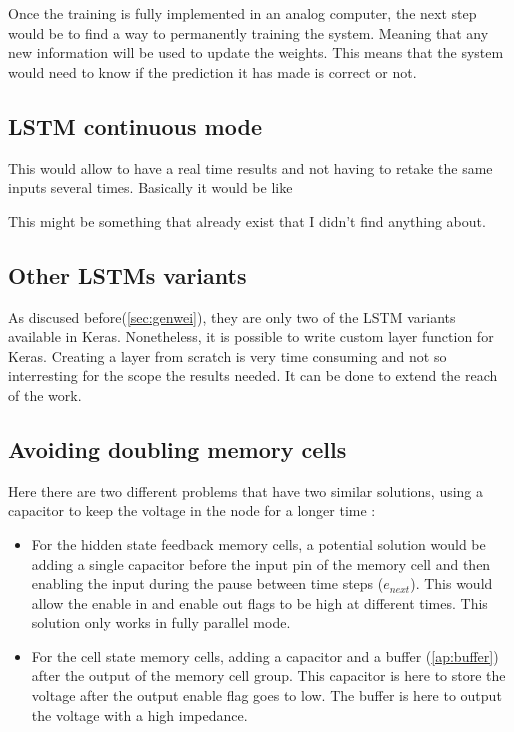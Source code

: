 Once the training is fully implemented in an analog computer, the next step would be to find a way to permanently training the system. Meaning that any new information will be used to update the weights. This means that the system would need to know if the prediction it has made is correct or not.

\subsection{\ac{LSTM} continuous mode}

This would allow to have a real time results and not having to retake the same inputs several times. Basically it would be like %

This might be something that already exist that I didn't find anything about.

\subsection{Other \acp{LSTM} variants}

As discused before(\cref{sec:genwei}), they are only two of the \ac{LSTM} variants available in Keras. Nonetheless, it is possible to write custom layer function for Keras. Creating a layer from scratch is very time consuming and not so interresting for the scope the results needed. It can be done to extend the reach of the work.

\subsection{Avoiding doubling memory cells}\label{subsec:noDoubleMemcell}

Here there are two different problems that have two similar solutions, using a capacitor to keep the voltage in the node for a longer time :
\begin{itemize}
  \item For the hidden state feedback memory cells, a potential solution would be adding a single capacitor before the input pin of the memory cell and then enabling the input during the pause between time steps ($e_{next}$). This would allow the enable in and enable out flags to be high at different times. This solution only works in fully parallel mode.
  \item For the cell state memory cells, adding a capacitor and a buffer (\cref{ap:buffer}) after the output of the memory cell group. This capacitor is here to store the voltage after the output enable flag goes to low. The buffer is here to output the voltage with a high impedance.
\end{itemize}

